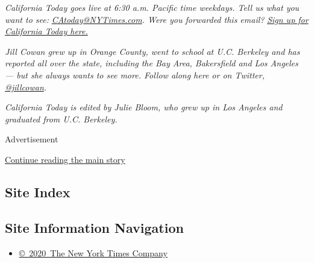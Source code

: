 \emph{California Today goes live at 6:30 a.m. Pacific time weekdays.
Tell us what you want to see:}
\href{mailto:CAtoday@NYTimes.com}{\emph{CAtoday@NYTimes.com}}\emph{.
Were you forwarded this email?}
\href{https://www.nytimes3xbfgragh.onion/newsletters/california-today?module=inline}{\emph{Sign
up for California Today here.}}

\emph{Jill Cowan grew up in Orange County, went to school at U.C.
Berkeley and has reported all over the state, including the Bay Area,
Bakersfield and Los Angeles --- but she always wants to see more. Follow
along here or on Twitter,}
\href{https://twitter.com/JillCowan}{\emph{@jillcowan}}\emph{.}

\emph{California Today is edited by Julie Bloom, who grew up in Los
Angeles and graduated from U.C. Berkeley.}

Advertisement

\protect\hyperlink{after-bottom}{Continue reading the main story}

\hypertarget{site-index}{%
\subsection{Site Index}\label{site-index}}

\hypertarget{site-information-navigation}{%
\subsection{Site Information
Navigation}\label{site-information-navigation}}

\begin{itemize}
\tightlist
\item
  \href{https://help.nytimes3xbfgragh.onion/hc/en-us/articles/115014792127-Copyright-notice}{©~2020~The
  New York Times Company}
\end{itemize}

